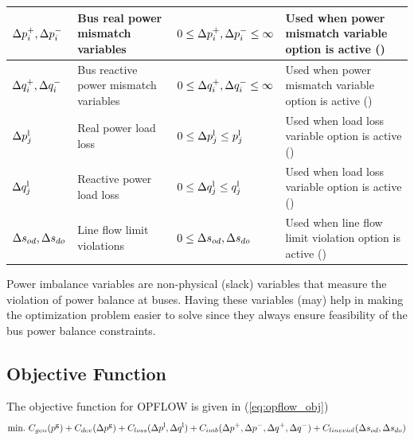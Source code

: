 \begin{table}[!htbp]
\begin{tabular}{|p{}|p{}|p{}|p{}|}
    \hline
    $\Delta{p}^{+}_i,\Delta{p}^{-}_i$ & Bus real power mismatch variables & $0 \le \Delta{p}^{+}_i,\Delta{p}^{-}_i \le \infty$ & Used when power mismatch variable option is active (\option{\opflowincludepowerimbalance}) \\
    \hline
    $\Delta{q}^{+}_i,\Delta{q}^{-}_i$ & Bus reactive power mismatch variables & $0 \le \Delta{q}^{+}_i,\Delta{q}^{-}_i \le \infty$ & Used when power mismatch variable option is active (\option{\opflowincludepowerimbalance}) \\
    \hline
    $\Delta{p}^{\mathrm{l}}_j$ & Real power load loss & $0 \le \Delta{p}^{\mathrm{l}}_j \le p^{\mathrm{l}}_j $ & Used when load loss variable option is active (\option{\opflowincludeloadloss}) \\
    \hline
    $\Delta{q}^{\mathrm{l}}_j$ & Reactive power load loss & $0 \le \Delta{q}^{\mathrm{l}}_j \le q^{\mathrm{l}}_j$ & Used when load loss variable option is active (\option{\opflowincludeloadloss}) \\
    \hline
    $\Delta{s}_{od}, \Delta{s}_{do}$ & Line flow limit violations & $0 \le \Delta{s}_{od}, \Delta{s}_{do}$ & Used when line flow limit violation option is active (\option{\opflowallowlineflowviolation}) \\
    \hline
  \end{tabular}
  \label{tab:opflow_vars}
\end{table}
Power imbalance variables are non-physical (slack) variables that measure the violation of power balance at buses. Having these variables (may) help in making the optimization problem easier to solve since they always ensure feasibility of the bus power balance constraints.

\subsection{Objective Function}\label{sec:opflow_obj}

The objective function for OPFLOW is given in (\ref{eq:opflow_obj})
\begin{equation}
\text{min.} ~ C_{gen}(p^{\text{g}}) + C_{dev}(\Delta p^{\text{g}}) +
C_{loss}(\Delta p^{\text{l}},\Delta q^{\text{l}}) + C_{imb}(\Delta p^{+},\Delta p^{-},\Delta q^{+},\Delta q^{-}) + C_{lineviol}(\Delta{s}_{od}, \Delta{s}_{do})
\label{eq:opflow_obj}
\end{equation}
 
